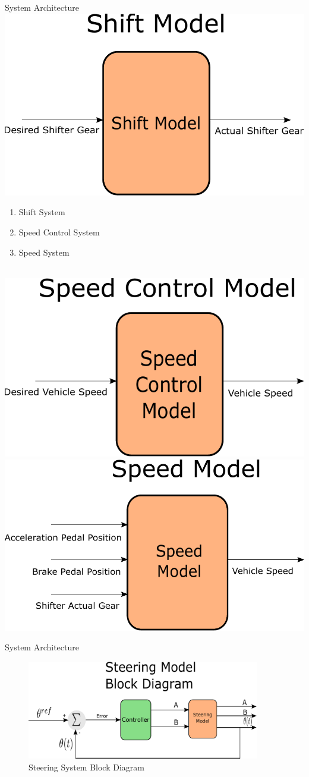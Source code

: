 \documentclass{beamer}
\begin{document}
\begin{frame}{System Architecture}
\centering \includegraphics[width=.45\linewidth]{figs/inkscape/shiftModelArchitecture}\quad%
\centering \begin{minipage}[b][0.4\textheight][c]{.45\linewidth} \begin{enumerate} \item Shift System \item Speed Control System \item Speed System \end{enumerate} \end{minipage}\\[1em]
\centering \includegraphics[width=.45\linewidth]{figs/inkscape/speedControlModelArchitecture}\quad%
\centering \includegraphics[width=.45\linewidth]{figs/inkscape/speedModelArchitecture}
\end{frame}


\begin{frame}{System Architecture}
\begin{figure}[h]
    \centering
    \captionsetup{justification=centering, margin=3cm}
    \includegraphics[width=4in]{figs/inkscape/steeringModelBlockDiagram}
    \caption{Steering System Block Diagram}
    \label{fig:steerBlockDiag}
\end{figure}
\end{frame}
\end{document}
